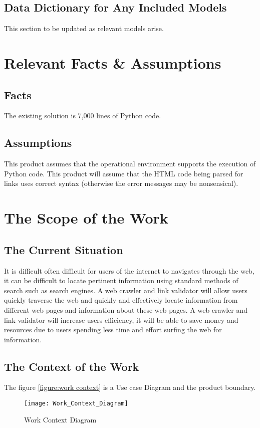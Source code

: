 \documentclass[titlepage]{article}
\begin{document}
\subsection*{Data Dictionary for Any Included Models}
This section to be updated as relevant models arise.

\section{Relevant Facts \& Assumptions}

\subsection*{Facts}
The existing solution is 7,000 lines of Python code.

\subsection*{Assumptions}
This product assumes that the operational environment supports the execution of Python code.
This product will assume that the HTML code being parsed for links uses correct syntax (otherwise the error messages may be nonsensical).

\section{The Scope of the Work }

\subsection*{The Current Situation}

It is difficult often difficult for users of the internet to navigates through the web, it can be difficult to locate pertinent information using standard methods of search such as search engines. A web crawler and link validator will allow users quickly traverse the web and quickly and effectively locate information from different web pages and information about these web pages. A web crawler and link validator will increase users efficiency, it will be able to save money and resources due to users spending less time and effort surfing the web for information.\newline

\subsection*{The Context of the Work }
The figure \ref{figure:work context} is a Use case Diagram and the product boundary.
\begin{figure}[h!]
  \caption{Work Context Diagram}
  \centering
    \texttt{[image: Work\_Context\_Diagram]}
\end{figure}
\label{figure:work context}
\end{document}
